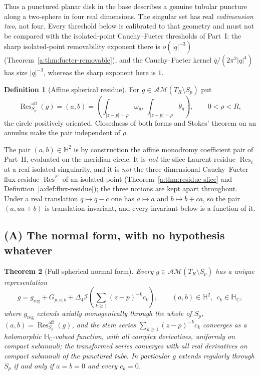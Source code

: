 \documentclass[11pt,a4paper]{article}
\numberwithin{equation}{section}
\newtheorem{theorem}{Theorem}[section]
\theoremstyle{definition}
\newtheorem{definition}[theorem]{Definition}
\theoremstyle{remark}
\theoremstyle{plain}
\newcommand{\HH}{\mathbb H}
\newcommand{\HC}{\mathbb H_{\mathbb C}}
\newcommand{\lap}{\Delta_4}
\newcommand{\I}{\mathcal I}
\newcommand{\AM}{\mathcal{AM}}
\newcommand{\om}{\omega}
\newcommand{\thet}{\theta}
\newcommand{\Sp}{S_{p}}
\newcommand{\Tube}{T}
\newcommand{\abs}[1]{\lvert #1\rvert}
\newcommand{\Res}{\operatorname{Res}}
\newcommand{\Resaff}{\operatorname{Res}^{\mathrm{aff}}}
\begin{document}
Thus a punctured planar disk in the base describes a genuine tubular
puncture along a two-sphere in four real dimensions.  The singular set has
real \emph{codimension two}, not four.  Every threshold below is calibrated
to that geometry and must not be compared with the isolated-point
Cauchy--Fueter thresholds of Part~I: the sharp isolated-point removability
exponent there is $o(\abs q^{-3})$ (Theorem~\ref{a:thm:fueter-removable}),
and the Cauchy--Fueter kernel
$\bar q/(2\pi^2\abs q^4)$ has size $\abs q^{-3}$, whereas the sharp
exponent here is $1$.

\begin{definition}[Affine spherical residue]
\label{d:def:resaff}
For $g\in\AM(\Tube_R\setminus\Sp)$ put
\begin{equation}
 \Resaff_{\Sp}(g)=(a,b)
 =\left(\int_{\abs{z-p}=\rho}\om_g,\ \int_{\abs{z-p}=\rho}\thet_g\right),
 \qquad 0<\rho<R,
 \label{d:eq:resaff}
\end{equation}
the circle positively oriented.  Closedness of both forms and Stokes'
theorem on an annulus make the pair independent of $\rho$.
\end{definition}

The pair $(a,b)\in\HH^2$ is by construction the affine monodromy coefficient
pair of Part~II, evaluated on the meridian circle.  It is \emph{not} the
slice Laurent residue $\Res_c$ at a real isolated singularity, and it is
\emph{not} the three-dimensional Cauchy--Fueter flux residue $\Res^F$ of
an isolated point (Theorem~\ref{a:thm:residue-slice} and
Definition~\ref{a:def:flux-residue}); the three notions
are kept apart throughout.  Under a real translation $q\mapsto q-c$ one has
$a\mapsto a$ and $b\mapsto b+ca$, so the pair $(a,ua+b)$ is
translation-invariant, and every invariant below is a function of it.

\subsection{(A) The normal form, with no hypothesis whatever}

\begin{theorem}[Full spherical normal form]
\label{d:thm:normal}
Every $g\in\AM(\Tube_R\setminus\Sp)$ has a unique representation
\begin{equation}
 g=g_{\mathrm{reg}}+G_{p;a,b}
   +\lap\I\left(\sum_{k\ge1}(z-p)^{-k}c_k\right),
 \qquad (a,b)\in\HH^2,\ \ c_k\in\HC,
 \label{d:eq:normal-form}
\end{equation}
where $g_{\mathrm{reg}}$ extends axially monogenically through the whole of
$\Sp$, $(a,b)=\Resaff_{\Sp}(g)$, and the stem series
$\sum_{k\ge1}(z-p)^{-k}c_k$ converges as a holomorphic $\HC$-valued
function, with all complex derivatives, uniformly on compact subannuli; the
transformed series converges with all real derivatives on compact
subannuli of the punctured tube.  In particular $g$ extends regularly
through $\Sp$ if and only if $a=b=0$ and every $c_k=0$.
\end{theorem}
\end{document}
